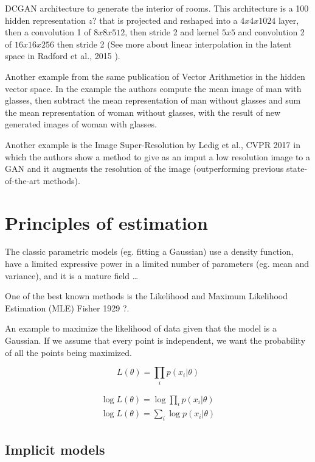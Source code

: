 \documentclass[b5paper]{report}
\begin{document}
DCGAN architecture to generate the interior of rooms. This architecture is a
100 hidden representation $z$? that is projected and reshaped into a $4x4x1024$
layer, then a convolution 1 of $8x8x512$, then stride 2 and kernel $5x5$ and
convolution 2 of $16x16x256$ then stride 2  (See more about linear
interpolation in the latent space in Radford et al., 2015
\cite{radford2015unsupervised}).

Another example from the same publication \cite{radford2015unsupervised} of
Vector Arithmetics in the hidden vector space. In the example the authors
compute the mean image of man with glasses, then subtract the mean
representation of man without glasses and sum the mean representation of woman
without glasses, with the result of new generated images of woman with glasses.

Another example is the Image Super-Resolution by Ledig et al., CVPR 2017
\cite{ledig2017photo} in which the authors show a method to give as an imput a
low resolution image to a GAN and it augments the resolution of the image
(outperforming previous state-of-the-art methods).

\section{Principles of estimation}

The classic parametric models (eg. fitting a Gaussian) use a density function,
have a limited expressive power in a limited number of parameters (eg. mean and
variance), and it is a mature field \dots

One of the best known methods is the Likelihood and Maximum Likelihood
Estimation (MLE) Fisher 1929 \cite{fisher1929tests}?.

An example to maximize the likelihood of data given that the model is a
Gaussian. If we assume that every point is independent, we want the probability
of all the points being maximized.

\begin{equation}
  L(\theta) = \prod_i p(x_i|\theta)
\end{equation}

\begin{align}
  \log L(\theta) = \log \prod_i p(x_i|\theta) \\
  \log L(\theta) = \sum_i \log p(x_i|\theta)
\end{align}

\subsection{Implicit models}
\end{document}
